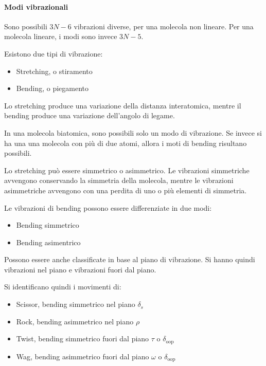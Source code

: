 \paragraph*{Modi vibrazionali}

Sono possibili \(3N-6\) vibrazioni diverse, per una molecola non
lineare. Per una molecola lineare, i modi sono invece \(3N-5\).

Esistono due tipi di vibrazione:
\begin{itemize}
\item Stretching, o stiramento
\item Bending, o piegamento
\end{itemize}


Lo stretching produce una variazione della distanza interatomica, mentre
il bending produce una variazione dell'angolo di legame.

In una molecola biatomica, sono possibili solo un modo di vibrazione. Se
invece si ha una una molecola con più di due atomi, allora i moti di
bending risultano possibili.

Lo stretching può essere simmetrico o asimmetrico. Le vibrazioni
simmetriche avvengono conservando la simmetria della molecola, mentre le
vibrazioni asimmetriche avvengono con una perdita di uno o più elementi
di simmetria.

Le vibrazioni di bending possono essere differenziate in due modi:
\begin{itemize}
\item Bending simmetrico
\item Bending asimentrico
\end{itemize}

Possono essere anche classificate in base al piano di vibrazione. Si
hanno quindi vibrazioni nel piano e vibrazioni fuori dal piano.

Si identificano quindi i movimenti di:
\begin{itemize}
\item Scissor, bending simmetrico nel piano \(\delta_s\)
\item Rock, bending asimmetrico nel piano \(\rho\)
\item Twist, bending simmetrico fuori dal piano \(\tau\) o \(\delta_{\text{oop}}\)
\item Wag, bending asimmetrico fuori dal piano \(\omega\) o \(\delta_{\text{oop}}\)
\end{itemize}

